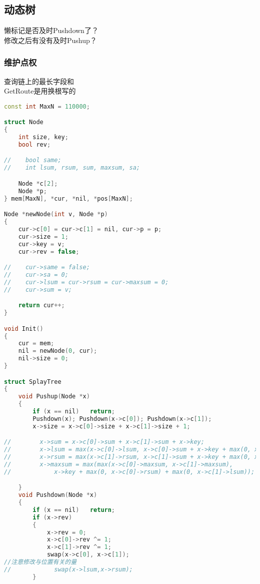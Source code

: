 \subsection{动态树}
    懒标记是否及时Pushdown了？\\
    修改之后有没有及时Pushup？\\
    \subsubsection{维护点权}
	查询链上的最长字段和\\
	GetRoute是用换根写的\\
        \begin{lstlisting}[language=c++]
const int MaxN = 110000;

struct Node
{
    int size, key;
    bool rev;

//    bool same;
//    int lsum, rsum, sum, maxsum, sa;

    Node *c[2];
    Node *p;
} mem[MaxN], *cur, *nil, *pos[MaxN];

Node *newNode(int v, Node *p)
{
    cur->c[0] = cur->c[1] = nil, cur->p = p;
    cur->size = 1;
    cur->key = v;
    cur->rev = false;

//    cur->same = false;
//    cur->sa = 0;
//    cur->lsum = cur->rsum = cur->maxsum = 0;
//    cur->sum = v;

    return cur++;
}

void Init()
{
    cur = mem;
    nil = newNode(0, cur);
    nil->size = 0;
}

struct SplayTree
{
    void Pushup(Node *x)
    {
        if (x == nil)   return;
        Pushdown(x); Pushdown(x->c[0]); Pushdown(x->c[1]);
        x->size = x->c[0]->size + x->c[1]->size + 1;

//        x->sum = x->c[0]->sum + x->c[1]->sum + x->key;
//        x->lsum = max(x->c[0]->lsum, x->c[0]->sum + x->key + max(0, x->c[1]->lsum));
//        x->rsum = max(x->c[1]->rsum, x->c[1]->sum + x->key + max(0, x->c[0]->rsum));
//        x->maxsum = max(max(x->c[0]->maxsum, x->c[1]->maxsum),
//            x->key + max(0, x->c[0]->rsum) + max(0, x->c[1]->lsum));

    }
    void Pushdown(Node *x)
    {
        if (x == nil)   return;
        if (x->rev)
        {
            x->rev = 0;
            x->c[0]->rev ^= 1;
            x->c[1]->rev ^= 1;
            swap(x->c[0], x->c[1]);
//注意修改与位置有关的量
//            swap(x->lsum,x->rsum);
        }


\end{lstlisting}
